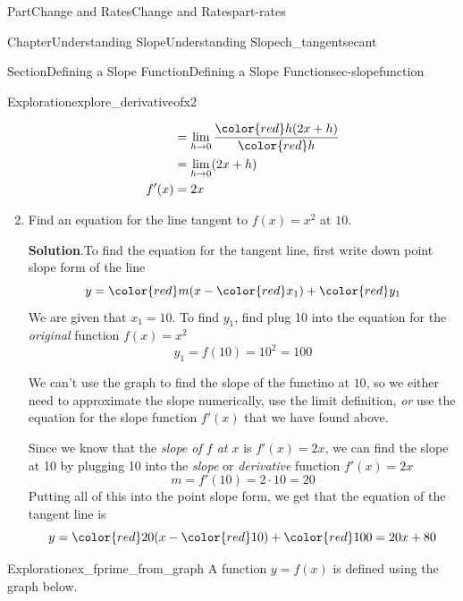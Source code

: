 \documentclass{tufte-book}
\newcommand{\blocktitlefont}{\relax}
\numberwithin{equation}{chapter}
\newcommand{\amp}{&}
\begin{document}
\begin{partptx}{Part}{Change and Rates}{}{Change and Rates}{}{}{part-rates}
\begin{chapterptx}{Chapter}{Understanding Slope}{}{Understanding Slope}{}{}{ch_tangentsecant}
\begin{sectionptx}{Section}{Defining a Slope Function}{}{Defining a Slope Function}{}{}{sec-slopefunction}
\begin{exploration}{Exploration}{}{explore_derivativeofx2}
\begin{enumerate}[font=\bfseries,label=(\alph*),ref=\alph*]
\begin{align*}
\amp =  \lim_{h\rightarrow 0}\dfrac{  {\color{red} h}(2x + h)  }{\color{red} h} \\
\amp =  \lim_{h\rightarrow 0} (2x + h)  \\
f'(x) \amp =  2x  
\end{align*}
%
\item{}Find an equation for the line tangent to \(f(x) = x^2\) at \(10\).%
\par\smallskip%
\noindent\textbf{\blocktitlefont Solution}.\hypertarget{explore_derivativeofx2-5-2}{}\quad{}To find the equation for the tangent line, first write down point slope form of the line%
\begin{equation*}
y = {\color{red} m } (x - {\color{red} x_1}) + {\color{red} y_1}
\end{equation*}
We are given that \(x_1=10\). To find \(y_1\), find plug 10 into the equation for the \emph{original} function \(f(x)=x^2\)%
\begin{equation*}
y_1 = f(10) = 10^2 = 100
\end{equation*}
%
\par
We can't use the graph to find the slope of the functino at \(10\), so we either need to approximate the slope numerically, use the limit definition, \emph{or} use the equation for the slope function \(f'(x)\) that we have found above.%
\par
Since we know that the \emph{slope of \(f\) at \(x\)} is \(f'(x) = 2x\), we can find the slope at 10 by plugging 10 into the \emph{slope} or \emph{derivative} function \(f'(x)=2x\)%
\begin{equation*}
m = f'(10) = 2\cdot 10 = 20
\end{equation*}
Putting all of this into the point slope form, we get that the equation of the tangent line is%
\begin{equation*}
y = {\color{red} 20} (x - {\color{red} 10}) + {\color{red} 100} 
= 20x +80
\end{equation*}
%
\end{enumerate}%
\end{exploration}%
\begin{exploration}{Exploration}{}{ex_fprime_from_graph}%
A function \(y=f(x)\) is defined using the graph below.%
\begin{image}{0.125}{0.75}{0.125}{}%
\resizebox{\linewidth}{!}{%
}
\end{image}
\end{exploration}
\end{sectionptx}
\end{chapterptx}
\end{partptx}
\end{document}

